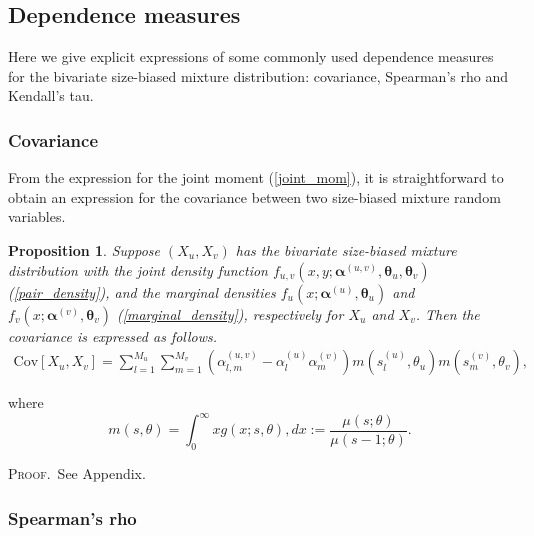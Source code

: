 \documentclass[11pt]{article}
\newtheorem{prop}{Proposition}
\def\a{\alpha} \def\b{\beta}
\def\beq{\begin{eqnarray}} \def\eeq{\end{eqnarray}}
\def\proof{\textsc{Proof}.\ }
\def\mC{\text{Cov}}
\begin{document}
\subsection{Dependence measures}
Here we give explicit expressions of some commonly used dependence measures for the bivariate size-biased mixture distribution: covariance, Spearman’s rho and Kendall’s tau. 

\subsubsection{Covariance}

From the expression for the joint moment (\ref{joint_mom}), it is straightforward to obtain an expression for the covariance between two size-biased mixture random variables.

\begin{prop} Suppose $(X_u, X_v)$ has the bivariate size-biased mixture distribution with the joint density function $f_{u,v}(x, y; \bm{\a}^{(u,v)}, \bm{\theta}_u, \bm{\theta}_v)$ (\ref{pair_density}), and the marginal densities $f_u(x; \bm{\a}^{(u)}, \bm{\theta}_u)$ and $f_v(x; \bm{\a}^{(v)}, \bm{\theta}_v)$ (\ref{marginal_density}), respectively for $X_u$ and  $X_v$. Then the covariance is expressed as follows.
\beq
\mC[X_u, X_v] = \sum_{l = 1}^{M_u}\sum_{m = 1}^{M_v} \left(\a^{(u,v)}_{l,m} - \a^{(u)}_{l} \a^{(v)}_{m}\right)m(s_l^{(u)},\theta_u)m(s_m^{(v)},\theta_v),
\eeq
\end{prop}
where
\[
m(s,\theta)=\mathbb \int_0^\infty x g(x;s,\theta),dx 
:=\frac{\mu(s;\theta)}{\mu(s-1;\theta)}.
\]

\proof See Appendix.

\subsubsection{Spearman's rho}
\end{document}
